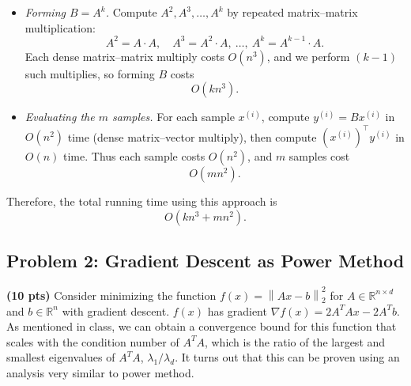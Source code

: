 \documentclass[10pt]{article}
\newcommand{\R}{\mathbb{R}}
\newcommand{\norm}[1]{\left\lVert #1\right\rVert}
\begin{document}
\begin{itemize}
\item \emph{Forming $B=A^k$.} Compute $A^2,A^3,\dots,A^k$ by repeated matrix--matrix multiplication:
\[
A^2=A\cdot A,\quad A^3=A^2\cdot A,\ \dots,\ A^k=A^{k-1}\cdot A.
\]
Each dense matrix--matrix multiply costs $O(n^3)$, and we perform $(k-1)$ such multiplies, so forming $B$ costs
\[
O(kn^3).
\]

\item \emph{Evaluating the $m$ samples.} For each sample $x^{(i)}$, compute $y^{(i)}=Bx^{(i)}$ in $O(n^2)$ time (dense matrix--vector multiply), then compute $(x^{(i)})^\top y^{(i)}$ in $O(n)$ time. Thus each sample costs $O(n^2)$, and $m$ samples cost
\[
O(mn^2).
\]
\end{itemize}

Therefore, the total running time using this approach is
\[
\boxed{O(kn^3 + mn^2).}
\]

\subsection{Problem 2: Gradient Descent as Power Method}
\textbf{(10 pts)} Consider minimizing the function $f(x) = \norm{Ax-b}_2^2$ for $A \in \R^{n\times d}$ and $b \in \R^n$ with gradient descent. $f(x)$ has gradient $\nabla f(x) = 2A^T A x - 2A^T b$. As mentioned in class, we can obtain a convergence bound for this function that scales with the condition number of $A^T A$, which is the ratio of the largest and smallest eigenvalues of $A^T A$, $\lambda_1/\lambda_d$. It turns out that this can be proven using an analysis very similar to power method.
\end{document}
